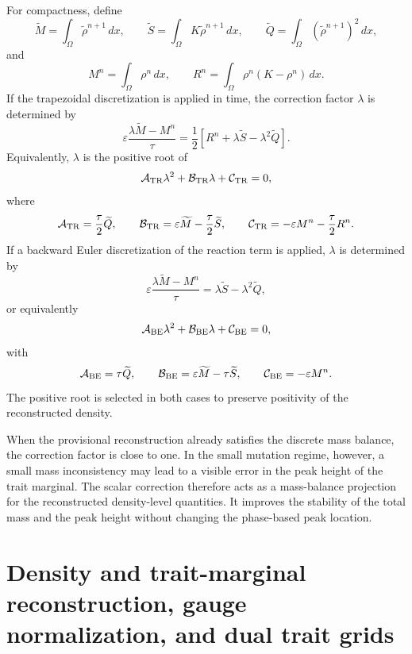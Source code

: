 \documentclass[11pt]{article}
\begin{document}
For compactness, define
\[
    \widetilde M
    =
    \int_\Omega \widetilde\rho^{n+1}\,dx,
    \qquad
    \widetilde S
    =
    \int_\Omega K\widetilde\rho^{n+1}\,dx,
    \qquad
    \widetilde Q
    =
    \int_\Omega (\widetilde\rho^{n+1})^2\,dx,
\]
and
\[
    M^n
    =
    \int_\Omega \rho^n\,dx,
    \qquad
    R^n
    =
    \int_\Omega \rho^n(K-\rho^n)\,dx .
\]
If the trapezoidal discretization is applied in time, the correction factor
\(\lambda\) is determined by
\[
    \varepsilon
    \frac{\lambda\widetilde M-M^n}{\tau}
    =
    \frac12
    \left[
        R^n+\lambda\widetilde S-\lambda^2\widetilde Q
    \right].
\]
Equivalently, \(\lambda\) is the positive root of
\[
    \mathcal A_{\rm TR}\lambda^2
    +
    \mathcal B_{\rm TR}\lambda
    +
    \mathcal C_{\rm TR}
    =
    0,
\]
where
\[
    \mathcal A_{\rm TR}
    =
    \frac{\tau}{2}\widetilde Q,
    \qquad
    \mathcal B_{\rm TR}
    =
    \varepsilon\widetilde M
    -
    \frac{\tau}{2}\widetilde S,
    \qquad
    \mathcal C_{\rm TR}
    =
    -\varepsilon M^n
    -
    \frac{\tau}{2}R^n .
\]
If a backward Euler discretization of
the reaction term is applied,  \(\lambda\) is determined by
\[
    \varepsilon
    \frac{\lambda\widetilde M-M^n}{\tau}
    =
    \lambda\widetilde S-\lambda^2\widetilde Q,
\]
or equivalently
\[
    \mathcal A_{\rm BE}\lambda^2
    +
    \mathcal B_{\rm BE}\lambda
    +
    \mathcal C_{\rm BE}
    =
    0,
\]
with
\[
    \mathcal A_{\rm BE}
    =
    \tau\widetilde Q,
    \qquad
    \mathcal B_{\rm BE}
    =
    \varepsilon\widetilde M
    -
    \tau\widetilde S,
    \qquad
    \mathcal C_{\rm BE}
    =
    -\varepsilon M^n .
\]
The positive root is selected in both cases to preserve positivity of the
reconstructed density.


When the provisional reconstruction already satisfies the discrete mass balance,
the correction factor is close to one.  In the small mutation regime, however,
a small mass inconsistency may lead to a visible error in the peak height of the
trait marginal.  The scalar correction therefore acts as a mass-balance
projection for the reconstructed density-level quantities.  It improves the
stability of the total mass and the peak height without changing the
phase-based peak location.



\section{Density and trait-marginal reconstruction, gauge normalization, and dual trait grids}\label{app:reconstruction}
\end{document}
